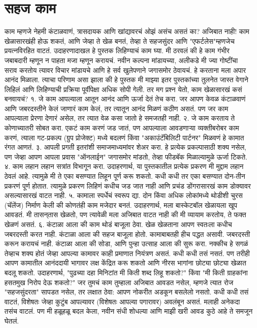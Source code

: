  \chapter{सहज काम}
काम म्हणजे नेहमी कंटाळवाणं, त्रासदायक आणि खांद्यावरचं ओझं असंच असतं का? अजिबात नाही! काम खेळासारखंही होऊ शकतं, आणि जेव्हा ते खेळ बनतं, तेव्हा ते सहजसुंदर आणि "एफर्टलेस"म्हणजेच प्रयत्नविरहित वाटतं.
उदाहरणादाखल हे पुस्तक लिहिण्याचं काम घ्या. मी ठरवलं की हे काम गंभीर जबाबदारी म्हणून न पाहता मजा म्हणून करायचं. नवीन कल्पना मांडायच्या, अलीकडे मी ज्या गोष्टींचा सराव करतोय त्यावर विचार मांडायचे आणि हे सर्व खुलेपणाने जगासमोर ठेवायचं. हे करताना मला अपार आनंद मिळाला. त्याचा परिणाम असा झाला की हे पुस्तक मी माझ्या इतर पुस्तकांच्या तुलनेत जास्त वेगाने लिहिलं आणि लिहिण्याची प्रक्रिया पूर्वीपेक्षा अधिक सोपी गेली.
तर मग प्रश्न येतो,  काम खेळासारखं कसं बनवायचं?
१. जे काम आपल्याला आतून आनंद आणि ऊर्जा देतं तेच करा. जर आपण केवळ कंटाळवाणं आणि जबरदस्तीने केलं जाणारं काम केलं, तर त्यातून आनंद मिळणं कठीण असतं. पण जर काम आपल्याला प्रेरणा देणारं असेल, तर त्यात वेळ कसा जातो हे समजतही नाही.
२. जे काम करताय ते कोणाच्यातरी सोबत करा. एकटं काम करणं जड जातं, पण आपल्याला आवडणाऱ्या व्यक्तीबरोबर काम करणं, त्याला गट-प्रकल्प (ग्रुप प्रोजेक्ट) मध्ये बदलणं किंवा "अकाउंटॅबिलिटी पार्टनर" मिळवणं हे कामात रंगत आणतं.
३. आपली प्रगती इतरांशी समाजमाध्यमांवर शेअर करा. हे प्रत्येक प्रकल्पासाठी शक्य नसेल, पण जेव्हा आपण आपला प्रवास "ऑनलाईन" जगासमोर मांडतो, तेव्हा फीडबॅक मिळाल्यामुळे ऊर्जा टिकते.
४. काम लहान लहान सत्रांत विभागून करा. उदाहरणार्थ, या पुस्तकातील प्रत्येक प्रकरण मी मुद्दाम लहान ठेवलं आहे. त्यामुळे मी ते एका बसण्यात लिहून पूर्ण करू शकतो. कधी कधी तर एका बसण्यात दोन-तीन प्रकरणं पूर्ण होतात. त्यामुळे प्रकरण लिहिणं कधीच जड जात नाही आणि प्रचंड डोंगरासारखं काम डोक्यावर असल्यासारखं वाटत नाही.
५. कामाला स्पर्धेचं स्वरूप द्या. दोन किंवा अधिक लोकांमध्ये थोडीशी चुरस (चॅलेंज) निर्माण केली की कोणतंही काम मजेदार बनतं. उदाहरणार्थ, मला बास्केटबॉल खेळायला खूप आवडतं. मी तासन्‌तास खेळतो, पण त्यावेळी मला अजिबात वाटत नाही की मी व्यायाम करतोय, ते फक्त खेळणं असतं.
६. कंटाळा आला की काम थोडं बाजूला ठेवा. खेळ खेळताना आपण स्वतःला कधीच जबरदस्ती करत नाही. कंटाळा आला की सहज बाजूला होतो. कामाबाबतही हीच पद्धत असावी. जबरदस्ती करून करायचं नाही. कंटाळा आला की सोडा, आणि पुन्हा उत्साह आला की सुरू करा.
नक्कीच हे सगळं तेव्हाच शक्य होतं जेव्हा आपल्या कामावर काही प्रमाणात नियंत्रण असतं. कधी कधी तसं नसतं. पण तरीही आपण कामातील आनंददायी भागावर लक्ष केंद्रित करू शकतो आणि नीरस भागांना छोट्या छोट्या खेळात बदलू शकतो. उदाहरणार्थ, "पुढच्या दहा मिनिटांत मी किती शब्द लिहू शकतो?" किंवा "मी किती ग्राहकांना हसतमुख निरोप देऊ शकतो?"
जर तुमचं काम तुम्हाला अजिबात आवडत नसेल, म्हणजे त्यात रोज "सहजसुंदरता" सापडत नसेल, तर लक्षात ठेवा: आपण नोकरीत अडकून बसलेलो नसतो. कधी कधी तसं वाटतं, विशेषतः जेव्हा कुटुंब आपल्यावर (विशेषतः आपल्या पगारावर) अवलंबून असतं. मलाही अनेकदा तसंच वाटलं. पण मी हळूहळू बदल केला, नवीन संधी शोधल्या आणि माझी खरी आवड कुठे आहे ते समजून घेतलं.
